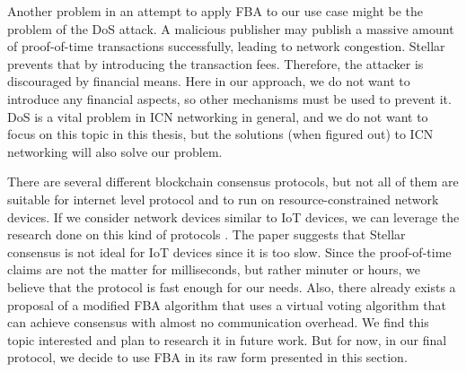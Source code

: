 Another problem in an attempt to apply FBA to our use case might be the problem of the DoS attack. A malicious publisher may publish a massive amount of proof-of-time transactions successfully, leading to network congestion. Stellar prevents that by introducing the transaction fees. Therefore, the attacker is discouraged by financial means. Here in our approach, we do not want to introduce any financial aspects, so other mechanisms must be used to prevent it. DoS is a vital problem in ICN networking in general\cite{gasti2013and}, and we do not want to focus on this topic in this thesis, but the solutions (when figured out) to ICN networking will also solve our problem.

There are several different blockchain consensus protocols, but not all of them are suitable for internet level protocol and to run on resource-constrained network devices.
If we consider network devices similar to IoT devices, we can leverage the research done on this kind of protocols \cite{salimitari2018survey}. The paper suggests that Stellar consensus is not ideal for IoT devices since it is too slow.
Since the proof-of-time claims are not the matter for milliseconds, but rather minuter or hours, we believe that the protocol is fast enough for our needs.
Also, there already exists a proposal of a modified FBA algorithm\cite{FCPpdf50:online} that uses a virtual voting algorithm that can achieve consensus with almost no communication overhead. We find this topic interested and plan to research it in future work. But for now, in our final protocol, we decide to use FBA in its raw form presented in this section.




